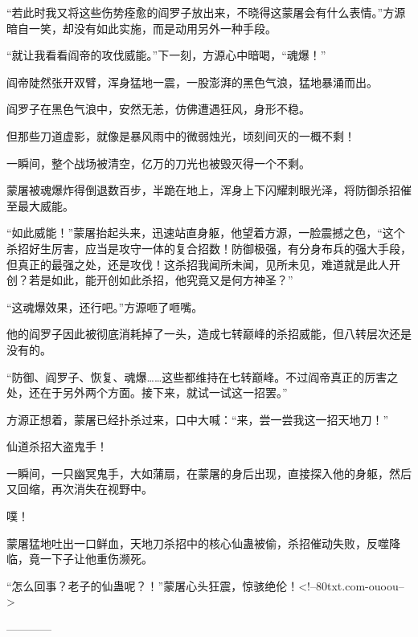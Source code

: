 \begin{this_body}
“若此时我又将这些伤势痊愈的阎罗子放出来，不晓得这蒙屠会有什么表情。”方源暗自一笑，却没有如此实施，而是动用另外一种手段。

“就让我看看阎帝的攻伐威能。”下一刻，方源心中暗喝，“魂爆！”

阎帝陡然张开双臂，浑身猛地一震，一股澎湃的黑色气浪，猛地暴涌而出。

阎罗子在黑色气浪中，安然无恙，仿佛遭遇狂风，身形不稳。

但那些刀道虚影，就像是暴风雨中的微弱烛光，顷刻间灭的一概不剩！

一瞬间，整个战场被清空，亿万的刀光也被毁灭得一个不剩。

蒙屠被魂爆炸得倒退数百步，半跪在地上，浑身上下闪耀刺眼光泽，将防御杀招催至最大威能。

“如此威能！”蒙屠抬起头来，迅速站直身躯，他望着方源，一脸震撼之色，“这个杀招好生厉害，应当是攻守一体的复合招数！防御极强，有分身布兵的强大手段，但真正的最强之处，还是攻伐！这杀招我闻所未闻，见所未见，难道就是此人开创？若是如此，能开创如此杀招，他究竟又是何方神圣？”

“这魂爆效果，还行吧。”方源咂了咂嘴。

他的阎罗子因此被彻底消耗掉了一头，造成七转巅峰的杀招威能，但八转层次还是没有的。

“防御、阎罗子、恢复、魂爆……这些都维持在七转巅峰。不过阎帝真正的厉害之处，还在于另外两个方面。接下来，就试一试这一招罢。”

方源正想着，蒙屠已经扑杀过来，口中大喊：“来，尝一尝我这一招天地刀！”

仙道杀招大盗鬼手！

一瞬间，一只幽冥鬼手，大如蒲扇，在蒙屠的身后出现，直接探入他的身躯，然后又回缩，再次消失在视野中。

噗！

蒙屠猛地吐出一口鲜血，天地刀杀招中的核心仙蛊被偷，杀招催动失败，反噬降临，竟一下子让他重伤濒死。

“怎么回事？老子的仙蛊呢？！”蒙屠心头狂震，惊骇绝伦！<!--80txt.com-ouoou-->

------------

\end{this_body}

